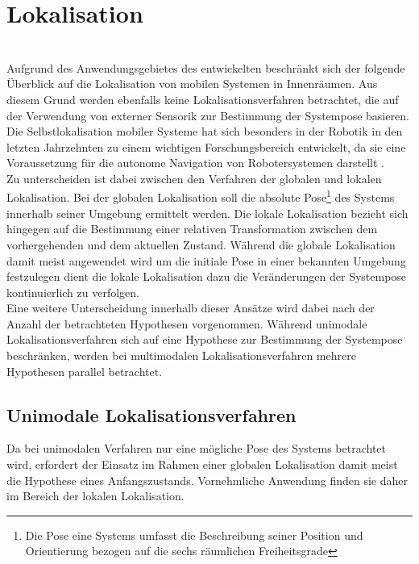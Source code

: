 \section{Lokalisation}
\label{chap:mcl}
\\
Aufgrund des Anwendungsgebietes des entwickelten  beschränkt sich der folgende Überblick auf die Lokalisation von mobilen Systemen in Innenräumen. Aus diesem Grund werden ebenfalls keine Lokalisationsverfahren betrachtet, die auf der Verwendung von externer Sensorik zur Bestimmung der Systempose basieren.\\
Die Selbstlokalisation mobiler Systeme hat sich besonders in der Robotik in den letzten Jahrzehnten zu einem wichtigen Forschungsbereich entwickelt, da sie eine Voraussetzung für die autonome Navigation von Robotersystemen darstellt .\\
Zu unterscheiden ist dabei zwischen den Verfahren der globalen und lokalen Lokalisation. Bei der globalen Lokalisation soll die absolute Pose\footnote{Die Pose eine Systems umfasst die Beschreibung seiner Position und Orientierung bezogen auf die sechs räumlichen Freiheitsgrade } des Systems innerhalb seiner Umgebung ermittelt werden. Die lokale Lokalisation bezieht sich hingegen auf die Bestimmung einer relativen Transformation zwischen dem vorhergehenden und dem aktuellen Zustand. Während die globale Lokalisation damit meist angewendet wird um die initiale Pose in einer bekannten Umgebung festzulegen dient die lokale Lokalisation dazu die Veränderungen der Systempose kontinuierlich zu verfolgen.\\ 
Eine weitere Unterscheidung innerhalb dieser Ansätze wird dabei nach der Anzahl der betrachteten Hypothesen vorgenommen. Während unimodale Lokalisationsverfahren sich auf eine Hypothese zur Bestimmung der Systempose beschränken, werden bei multimodalen Lokalisationsverfahren mehrere Hypothesen parallel betrachtet.
\subsection{Unimodale Lokalisationsverfahren}
Da bei unimodalen Verfahren nur eine mögliche Pose des Systems betrachtet wird, erfordert der Einsatz im Rahmen einer globalen Lokalisation damit meist die \red[(sinnvolle)] Hypothese eines Anfangszustands. Vornehmliche Anwendung finden sie daher im Bereich der lokalen Lokalisation. 

